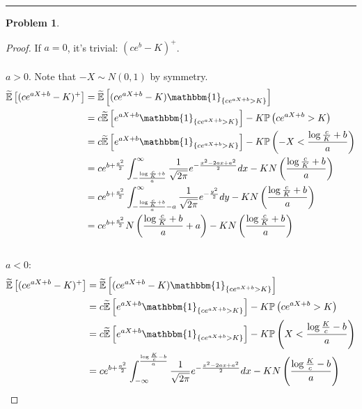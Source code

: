 \documentclass[a4paper, 10pt]{article}
\theoremstyle{definition}
\newtheorem{problem}{Problem}
\theoremstyle{hSol}
\begin{document}
\noindent\rule{16cm}{0.4pt}
\begin{problem} 
\end{problem}
\begin{proof} If $a=0$, it's trivial: $(ce^b - K)^+$.\\
~\\
$a > 0$. Note that $-X\sim N(0,1)$ by symmetry.
\begin{equation}
  \begin{split}
    \widetilde{\mathbb{E}}\left[(ce^{aX+b}-K)^+\right] &= \widetilde{\mathbb{E}}\left[(ce^{aX+b}-K) \mathbbm{1}_{\{ce^{aX+b}>K\}}\right] \\
    &= c\widetilde{\mathbb{E}}\left[e^{aX+b} \mathbbm{1}_{\{ce^{aX+b}>K\}}\right] - K \mathbb{P}\left(ce^{aX+b}>K\right)\\
    &= c\widetilde{\mathbb{E}}\left[e^{aX+b} \mathbbm{1}_{\{ce^{aX+b}>K\}}\right] - K \mathbb{P}\left(-X<\frac{\log\frac{c}{K} + b}{a}\right)\\
    &= ce^{b+\frac{a^2}{2}}\int_{-\frac{\log\frac{c}{K} + b}{a}}^{\infty} \frac{1}{\sqrt{2\pi}}e^{-\frac{x^2-2ax+a^2}{2}}dx - KN\left(\frac{\log\frac{c}{K} + b}{a}\right)\\
    &= ce^{b+\frac{a^2}{2}}\int_{-\frac{\log\frac{c}{K} + b}{a}-a}^{\infty} \frac{1}{\sqrt{2\pi}}e^{-\frac{y^2}{2}}dy - KN\left(\frac{\log\frac{c}{K} + b}{a}\right)\\
    &= ce^{b+\frac{a^2}{2}}N\left(\frac{\log\frac{c}{K} + b}{a} + a\right)- KN\left(\frac{\log\frac{c}{K} + b}{a}\right)
  \end{split}
\end{equation}
~\\
$a < 0$:
\begin{equation}
  \begin{split}
    \widetilde{\mathbb{E}}\left[(ce^{aX+b}-K)^+\right] &= \widetilde{\mathbb{E}}\left[(ce^{aX+b}-K) \mathbbm{1}_{\{ce^{aX+b}>K\}}\right] \\
    &= c\widetilde{\mathbb{E}}\left[e^{aX+b} \mathbbm{1}_{\{ce^{aX+b}>K\}}\right] - K \mathbb{P}\left(ce^{aX+b}>K\right)\\
    &= c\widetilde{\mathbb{E}}\left[e^{aX+b} \mathbbm{1}_{\{ce^{aX+b}>K\}}\right] - K \mathbb{P}\left(X<\frac{\log\frac{K}{c} - b}{a}\right)\\
    &= ce^{b+\frac{a^2}{2}}\int_{-\infty}^{\frac{\log\frac{K}{c} - b}{a}} \frac{1}{\sqrt{2\pi}}e^{-\frac{x^2-2ax+a^2}{2}}dx - KN\left(\frac{\log\frac{K}{c} - b}{a}\right)\\

\end{split}
\end{equation}
\end{proof}
\end{document}
